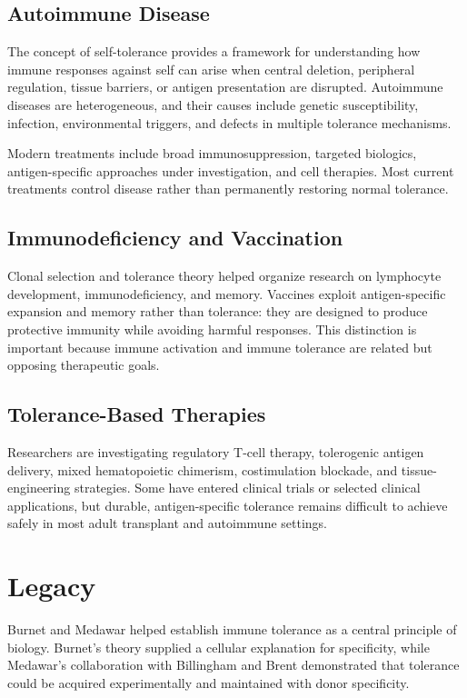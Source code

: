 \subsection{Autoimmune Disease}

The concept of self-tolerance provides a framework for understanding how immune responses against self can arise when central deletion, peripheral regulation, tissue barriers, or antigen presentation are disrupted. Autoimmune diseases are heterogeneous, and their causes include genetic susceptibility, infection, environmental triggers, and defects in multiple tolerance mechanisms.

Modern treatments include broad immunosuppression, targeted biologics, antigen-specific approaches under investigation, and cell therapies. Most current treatments control disease rather than permanently restoring normal tolerance.

\subsection{Immunodeficiency and Vaccination}

Clonal selection and tolerance theory helped organize research on lymphocyte development, immunodeficiency, and memory. Vaccines exploit antigen-specific expansion and memory rather than tolerance: they are designed to produce protective immunity while avoiding harmful responses. This distinction is important because immune activation and immune tolerance are related but opposing therapeutic goals.

\subsection{Tolerance-Based Therapies}

Researchers are investigating regulatory T-cell therapy, tolerogenic antigen delivery, mixed hematopoietic chimerism, costimulation blockade, and tissue-engineering strategies. Some have entered clinical trials or selected clinical applications, but durable, antigen-specific tolerance remains difficult to achieve safely in most adult transplant and autoimmune settings.

\section{Legacy}

Burnet and Medawar helped establish immune tolerance as a central principle of biology. Burnet's theory supplied a cellular explanation for specificity, while Medawar's collaboration with Billingham and Brent demonstrated that tolerance could be acquired experimentally and maintained with donor specificity.

